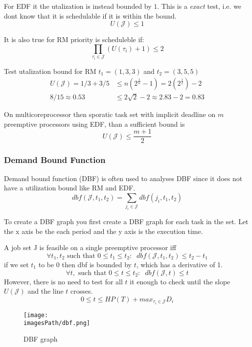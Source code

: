 For EDF it the utalization is instead bounded by $1$. This is a \textit{exact} test, i.e. we dont know that it is schedulable if it is within the bound.
\begin{equation}
  U(\mathcal{J}) \leq 1
\end{equation}

It is also true for RM priority is scheduleble if:
\begin{equation}
   \prod_{\tau_i\in\mathcal{J}} (U(\tau_i)+1) \leq 2
\end{equation}
     
\begin{exampleblock}{Test utalization bound for RM}
  $t_1 = (1,3,3)$ and $t_2 = (3,5,5)$
  \begin{align*}
  U(\mathcal{J}) = 1/3 + 3/5
  &\leq n(2^{\frac{1}{n}}-1) = 2(2^{\frac{1}{2}}) -2 \\
  8/15 \approx 0.53 &\leq 2\sqrt{2}-2 \approx 2.83 -2 = 0.83
  \end{align*}
\end{exampleblock}
 
On multicoreprocessor then sporatic task set with implicit deadline on $m$ preemptive processors
using EDF, than a sufficient bound is
\begin{equation}
  U(\mathcal{J}) \leq \frac{m + 1}{2}
\end{equation}



\subsubsection{Demand Bound Function}
Demand bound function (DBF) is often used to analyses DBF since it does not have a utilization bound like RM and EDF.
\begin{equation}
  dbf(\mathcal{J}, t_1, t_2) = \sum_{j_i\in\mathcal{J}} dbf(j_i, t_1, t_2)
\end{equation}

To create a DBF graph you first create a DBF graph for each task in the set. Let the 
x axis be the each period and the y axis is the execution time.

A job set J is feasible on a single preemptive processor iff
\begin{equation}
  \forall t_1, t_2 \text{ such that } 0 \leq t_1 \leq t_2: \;\; dbf(\mathcal{J}, t_1, t_2) \leq t_2 - t_1
\end{equation}
if we set $t_1$ to be $0$ then dbf is bounded by $t$, which has a derivative of 1.
\begin{equation}
  \forall t, \text{ such that } 0 \leq t \leq t_2: \;\; dbf(\mathcal{J}, t) \leq t
\end{equation}
However, there is no need to test for all $t$ it enough to check until the slope $U(\mathcal{J})$ and the line $t$ crosses.
\begin{equation}
  0 \leq t \leq HP(T) + max_{\tau_i\in\mathcal{J}} D_i
\end{equation}
\begin{figure}[H]
    \centering
    \texttt{[image: \\imagesPath/dbf.png]}
    \caption{DBF graph}
    \label{fig:dbf}
\end{figure}

